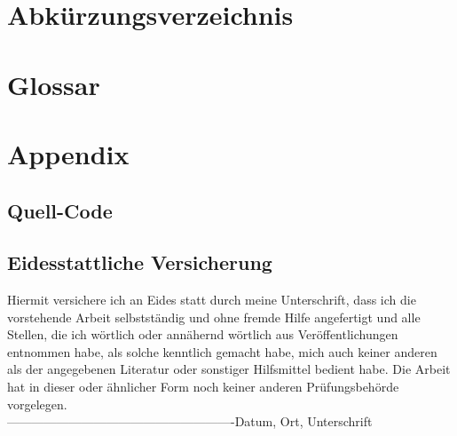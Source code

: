 \documentclass[oneside,bibliography=totocnumbered,BCOR=5mm]{scrbook}%
\theoremstyle{definition}
\theoremstyle{definition}
\theoremstyle{definition}
\theoremstyle{definition}
\theoremstyle{definition}
\theoremstyle{definition}
\begin{document}

\printbibliography[
heading=bibintoc,
title={Bibliography}
]


\newpage

\chapter{Abk\"urzungsverzeichnis}
\newpage
\chapter{Glossar}




\appendix


\chapter{Appendix}


\section{Quell-Code}




\newpage
\thispagestyle{empty}       %
\noindent

\section*{Eidesstattliche Versicherung}
Hiermit versichere ich an Eides statt durch meine Unterschrift, dass ich die vorstehende Arbeit selbstst\"andig und ohne fremde Hilfe angefertigt und alle Stellen, die ich w\"ortlich oder ann\"ahernd w\"ortlich aus Ver\"offentlichungen entnommen habe, als solche kenntlich gemacht habe, mich auch keiner anderen als der angegebenen Literatur oder sonstiger Hilfsmittel bedient habe. Die Arbeit hat in dieser oder \"ahnlicher Form noch keiner anderen Pr\"ufungsbeh\"orde vorgelegen.\\
\linebreak[4]
\linebreak[4]
\linebreak[4]
\linebreak[4]
-------------------------------------------------------\linebreak[4]
Datum, Ort, Unterschrift
\end{document}
